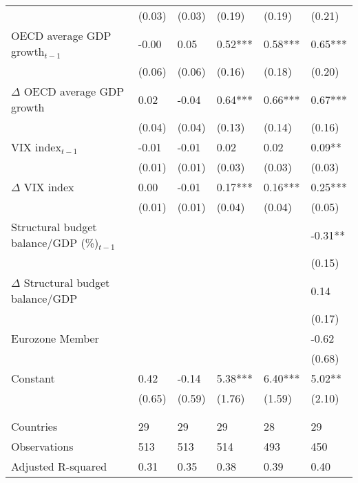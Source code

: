 {\begin{tabular}{lp{2cm}p{2cm}p{2cm}p{2cm}p{2cm}}
   & (0.03) & (0.03) & (0.19) & (0.19) & (0.21) \\ 
  OECD average GDP growth$_{t-1}$ & -0.00 & 0.05 & 0.52*** & 0.58*** & 0.65*** \\ 
   & (0.06) & (0.06) & (0.16) & (0.18) & (0.20) \\ 
  $\Delta$ OECD average GDP growth & 0.02 & -0.04 & 0.64*** & 0.66*** & 0.67*** \\ 
   & (0.04) & (0.04) & (0.13) & (0.14) & (0.16) \\ 
  VIX index$_{t-1}$ & -0.01 & -0.01 & 0.02 & 0.02 & 0.09** \\ 
   & (0.01) & (0.01) & (0.03) & (0.03) & (0.03) \\ 
  $\Delta$ VIX index & 0.00 & -0.01 & 0.17*** & 0.16*** & 0.25*** \\ 
   & (0.01) & (0.01) & (0.04) & (0.04) & (0.05) \\ 
  Structural budget balance/GDP (\%)$_{t-1}$ &  &  &  &  & -0.31** \\ 
   &  &  &  &  & (0.15) \\ 
  $\Delta$ Structural budget balance/GDP &  &  &  &  & 0.14 \\ 
   &  &  &  &  & (0.17) \\ 
  Eurozone Member &  &  &  &  & -0.62 \\ 
   &  &  &  &  & (0.68) \\ 
  Constant & 0.42 & -0.14 & 5.38*** & 6.40*** & 5.02** \\ 
   & (0.65) & (0.59) & (1.76) & (1.59) & (2.10) \\ 
   &  &  &  &  &  \\ 
   &  &  &  &  &  \\ 
  Countries & 29 & 29 & 29 & 28 & 29 \\ 
  Observations & 513 & 513 & 514 & 493 & 450 \\ 
  Adjusted R-squared & 0.31 & 0.35 & 0.38 & 0.39 & 0.40 \\ 
   \hline
\end{tabular}
}
